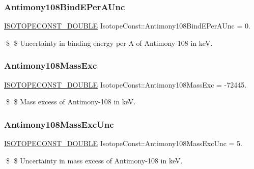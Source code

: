 \subsubsection{\texorpdfstring{Antimony108\+Bind\+E\+Per\+A\+Unc}{Antimony108BindEPerAUnc}}
{\footnotesize\ttfamily \mbox{\hyperlink{group___isotope_const-_macros_ga8f45a7272ce02c0b4c65c44636ed719a}{I\+S\+O\+T\+O\+P\+E\+C\+O\+N\+S\+T\+\_\+\+D\+O\+U\+B\+LE}} Isotope\+Const\+::\+Antimony108\+Bind\+E\+Per\+A\+Unc = 0.}

\$ \$ Uncertainty in binding energy per A of Antimony-\/108 in keV. \mbox{\label{group___isotope_const-_antimony-_sb108_ga4b41950c1a96d8a1ea76c4091c44b818}} 
\subsubsection{\texorpdfstring{Antimony108\+Mass\+Exc}{Antimony108MassExc}}
{\footnotesize\ttfamily \mbox{\hyperlink{group___isotope_const-_macros_ga8f45a7272ce02c0b4c65c44636ed719a}{I\+S\+O\+T\+O\+P\+E\+C\+O\+N\+S\+T\+\_\+\+D\+O\+U\+B\+LE}} Isotope\+Const\+::\+Antimony108\+Mass\+Exc = -\/72445.}

\$ \$ Mass excess of Antimony-\/108 in keV. \mbox{\label{group___isotope_const-_antimony-_sb108_ga4746334f55469dfca9826203ecaefe1a}} 
\subsubsection{\texorpdfstring{Antimony108\+Mass\+Exc\+Unc}{Antimony108MassExcUnc}}
{\footnotesize\ttfamily \mbox{\hyperlink{group___isotope_const-_macros_ga8f45a7272ce02c0b4c65c44636ed719a}{I\+S\+O\+T\+O\+P\+E\+C\+O\+N\+S\+T\+\_\+\+D\+O\+U\+B\+LE}} Isotope\+Const\+::\+Antimony108\+Mass\+Exc\+Unc = 5.}

\$ \$ Uncertainty in mass excess of Antimony-\/108 in keV. \mbox{\label{group___isotope_const-_antimony-_sb108_ga737ecea0ea13d0bfcfec50e44512a63d}} 
